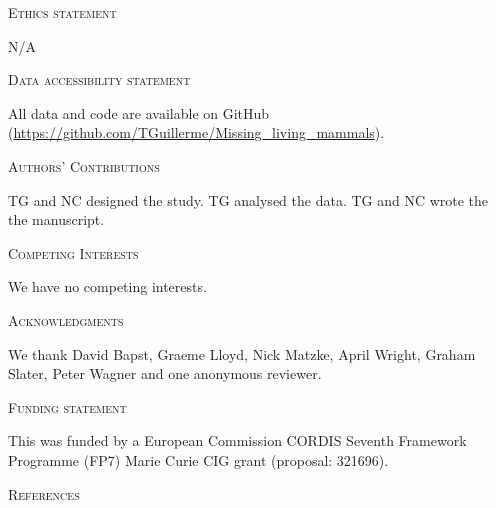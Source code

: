 \documentclass[12pt,letterpaper]{article}
\renewcommand{\section}[1]{%
\bigskip
\begin{center}
\begin{Large}
\normalfont\scshape #1
\medskip
\end{Large}
\end{center}}
\begin{document}
\section{Ethics statement}
N/A
\section{Data accessibility statement}
All data and code are available on GitHub (\url{https://github.com/TGuillerme/Missing_living_mammals}).
\section{Authors' Contributions}
TG and NC designed the study. TG analysed the data. TG and NC wrote the the manuscript.
\section{Competing Interests}
We have no competing interests.
\section{Acknowledgments}
We thank David Bapst, Graeme Lloyd, Nick Matzke, April Wright, Graham Slater, Peter Wagner and one anonymous reviewer.
\section{Funding statement}
This was funded by a European Commission CORDIS Seventh Framework Programme (FP7) Marie Curie CIG grant (proposal: 321696).

\section{References}




\end{document}
